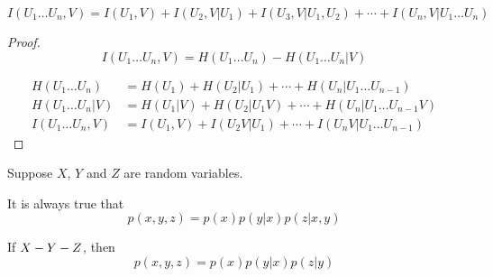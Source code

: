 \begin{theorem}
    \[
        I(U_1\ldots U_n,V) = I(U_1,V) + I(U_2,V\vert U_1    ) + I(U_3,V\vert U_1, U_2) + \cdots + I(U_n, V \vert U_1\ldots U_n)
    \]
\end{theorem}
\begin{proof}
    \[
        I(U_1\ldots U_n, V) = H(U_1\ldots U_n) - H(U_1\ldots U_n \vert V)    
    \]
    
    \[
        \begin{aligned}
            H(U_1\ldots U_n) &= H(U_1) + H(U_2\vert U_1) + \cdots + H(U_n \vert U_1 \ldots U_{n-1})\\
            H(U_1\ldots U_n \vert V) &= H(U_1 \vert V) + H(U_2\vert U_1 V) + \cdots + H(U_n \vert U_1 \ldots U_{n-1} V)\\
            I(U_1\ldots U_n, V) &= I(U_1,V) + I(U_2 V \vert U_1) + \cdots + I(U_n V \vert U_1 \ldots U_{n-1})
        \end{aligned}
    \]
\end{proof}

\begin{remark}
    Suppose $X$, $Y$ and $Z$ are random variables.
    
    It is always true that
    \[
        p(x,y,z) = p(x)p(y\vert x) p(z\vert x,y)
    \]
    
    If $X\-- Y\-- Z$, then
    \[
        p(x,y,z) = p(x)p(y\vert x) p(z\vert y)
    \]
\end{remark}